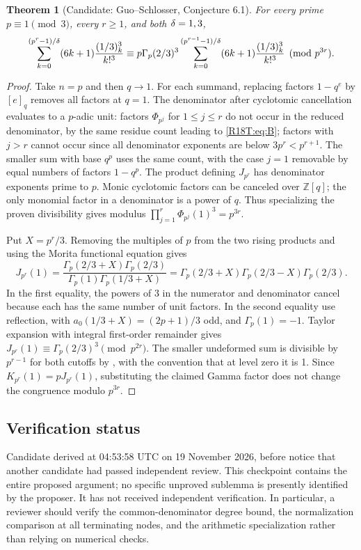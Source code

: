\documentclass[11pt,a4paper]{article}
\newtheorem{SourceRbiTtheorem}{Theorem}
\begin{document}
\begin{SourceRbiTtheorem}[Candidate: Guo--Schlosser, Conjecture 6.1]
For every prime \(p\equiv1\pmod3\), every \(r\ge1\), and both
\(\delta=1,3\),
\[
 \sum_{k=0}^{(p^r-1)/\delta}(6k+1)\frac{(1/3)_k^3}{k!^3}
 \equiv p\Gamma_p(2/3)^3
 \sum_{k=0}^{(p^{r-1}-1)/\delta}(6k+1)\frac{(1/3)_k^3}{k!^3}
 \pmod{p^{3r}}.
\]
\end{SourceRbiTtheorem}
\begin{proof}
Take \(n=p\) and then \(q\to1\). For each summand, replacing
factors \(1-q^e\) by \([e]_q\) removes all factors at \(q=1\).
The denominator after cyclotomic cancellation evaluates to a
\(p\)-adic unit: factors \(\Phi_{p^j}\) for \(1\le j\le r\)
do not occur in the reduced denominator, by the same residue
count leading to \eqref{R18T:eq:B}; factors with \(j>r\) cannot occur
since all denominator exponents are below \(3p^r<p^{r+1}\).
The smaller sum with base \(q^p\) uses the same count, with the
case \(j=1\) removable by equal numbers of factors \(1-q^p\).
The product defining \(J_{p^r}\) has denominator exponents prime
to \(p\). Monic cyclotomic factors can be canceled over
\(\mathbb Z[q]\); the only monomial factor in a denominator is a
power of \(q\). Thus specializing the proven divisibility gives
modulus \(\prod_{j=1}^r\Phi_{p^j}(1)^3=p^{3r}\).

Put \(X=p^r/3\). Removing the multiples of \(p\) from the two
rising products and using the Morita functional equation gives
\[
 J_{p^r}(1)=
 \frac{\Gamma_p(2/3+X)\Gamma_p(2/3)}
 {\Gamma_p(1)\Gamma_p(1/3+X)}
 =\Gamma_p(2/3+X)\Gamma_p(2/3-X)\Gamma_p(2/3).
\]
In the first equality, the powers of 3 in the numerator and
denominator cancel because each has the same number of unit
factors. In the second equality use reflection, with
\(a_0(1/3+X)=(2p+1)/3\) odd, and \(\Gamma_p(1)=-1\).
Taylor expansion with integral first-order remainder
\cite[Theorem 14]{R18T:LR} gives
\(J_{p^r}(1)\equiv\Gamma_p(2/3)^3\pmod{p^{2r}}\).
The smaller undeformed sum is divisible by \(p^{r-1}\) for both
cutoffs by \cite[(6.2)]{R18T:GS}, with the convention that at level zero
it is 1. Since \(K_{p^r}(1)=pJ_{p^r}(1)\), substituting the claimed
Gamma factor does not change the congruence modulo \(p^{3r}\).
\end{proof}

\subsection*{Verification status}
Candidate derived at 04:53:58 UTC on 19 November 2026, before notice
that another candidate had passed independent review. This checkpoint
contains the entire proposed argument; no specific unproved sublemma
is presently identified by the proposer. It has not received
independent verification. In particular, a reviewer should verify
the common-denominator degree bound, the normalization comparison
at all terminating nodes, and the arithmetic specialization
rather than relying on numerical checks.
\endgroup
\end{document}
